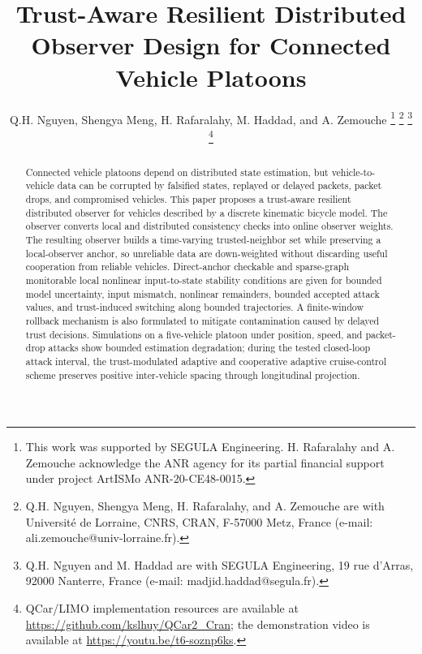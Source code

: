\documentclass[letterpaper,journal]{IEEEtran}
\begin{document}
\title{Trust-Aware Resilient Distributed Observer Design for Connected Vehicle Platoons}
\author{Q.H. Nguyen, Shengya Meng, H. Rafaralahy, M. Haddad, and A. Zemouche%
\thanks{This work was supported by SEGULA Engineering. H. Rafaralahy and A. Zemouche acknowledge the ANR agency for its partial financial support under project ArtISMo ANR-20-CE48-0015.}%
\thanks{Q.H. Nguyen, Shengya Meng, H. Rafaralahy, and A. Zemouche are with Universit\'e de Lorraine, CNRS, CRAN, F-57000 Metz, France (e-mail: ali.zemouche@univ-lorraine.fr).}%
\thanks{Q.H. Nguyen and M. Haddad are with SEGULA Engineering, 19 rue d'Arras, 92000 Nanterre, France (e-mail: madjid.haddad@segula.fr).}%
\thanks{QCar/LIMO implementation resources are available at \protect\url{https://github.com/kslhuy/QCar2_Cran}; the demonstration video is available at \protect\url{https://youtu.be/t6-soznp6ks}.}}

\maketitle

\begin{abstract}
Connected vehicle platoons depend on distributed state estimation, but vehicle-to-vehicle data can be corrupted by falsified states, replayed or delayed packets, packet drops, and compromised vehicles. This paper proposes a trust-aware resilient distributed observer for vehicles described by a discrete kinematic bicycle model. The observer converts local and distributed consistency checks into online observer weights. The resulting observer builds a time-varying trusted-neighbor set while preserving a local-observer anchor, so unreliable data are down-weighted without discarding useful cooperation from reliable vehicles. Direct-anchor checkable and sparse-graph monitorable local nonlinear input-to-state stability conditions are given for bounded model uncertainty, input mismatch, nonlinear remainders, bounded accepted attack values, and trust-induced switching along bounded trajectories. A finite-window rollback mechanism is also formulated to mitigate contamination caused by delayed trust decisions. Simulations on a five-vehicle platoon under position, speed, and packet-drop attacks show bounded estimation degradation; during the tested closed-loop attack interval, the trust-modulated adaptive and cooperative adaptive cruise-control scheme preserves positive inter-vehicle spacing through longitudinal projection.
\end{abstract}
\end{document}
